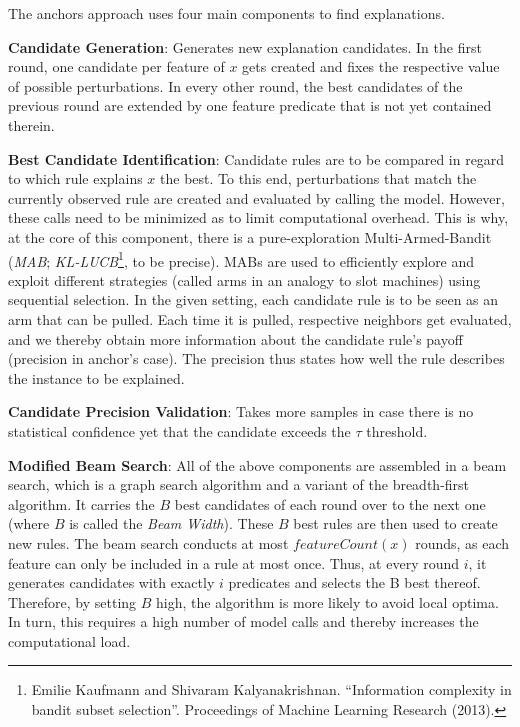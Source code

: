 \documentclass[
  11pt,
]{scrbook}
\begin{document}
The anchors approach uses four main components to find explanations.

\textbf{Candidate Generation}: Generates new explanation candidates. In the first round, one candidate per feature of \(x\) gets created and fixes the respective value of possible perturbations. In every other round, the best candidates of the previous round are extended by one feature predicate that is not yet contained therein.

\textbf{Best Candidate Identification}: Candidate rules are to be compared in regard to which rule explains \(x\) the best. To this end, perturbations that match the currently observed rule are created and evaluated by calling the model. However, these calls need to be minimized as to limit computational overhead. This is why, at the core of this component, there is a pure-exploration Multi-Armed-Bandit (\emph{MAB}; \emph{KL-LUCB}\footnote{Emilie Kaufmann and Shivaram Kalyanakrishnan. ``Information complexity in bandit subset selection''. Proceedings of Machine Learning Research (2013).}, to be precise). MABs are used to efficiently explore and exploit different strategies (called arms in an analogy to slot machines) using sequential selection. In the given setting, each candidate rule is to be seen as an arm that can be pulled. Each time it is pulled, respective neighbors get evaluated, and we thereby obtain more information about the candidate rule's payoff (precision in anchor's case). The precision thus states how well the rule describes the instance to be explained.

\textbf{Candidate Precision Validation}: Takes more samples in case there is no statistical confidence yet that the candidate exceeds the \(\tau\) threshold.

\textbf{Modified Beam Search}: All of the above components are assembled in a beam search, which is a graph search algorithm and a variant of the breadth-first algorithm. It carries the \(B\) best candidates of each round over to the next one (where \(B\) is called the \emph{Beam Width}). These \(B\) best rules are then used to create new rules. The beam search conducts at most \(featureCount(x)\) rounds, as each feature can only be included in a rule at most once. Thus, at every round \(i\), it generates candidates with exactly \(i\) predicates and selects the B best thereof. Therefore, by setting \(B\) high, the algorithm is more likely to avoid local optima. In turn, this requires a high number of model calls and thereby increases the computational load.
\end{document}
